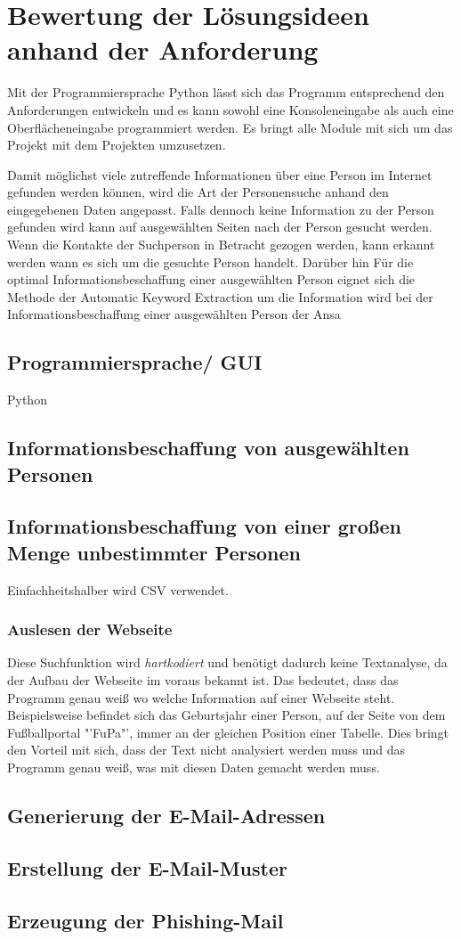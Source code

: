 

\chapter{Bewertung der Lösungsideen anhand der Anforderung}  %
\label{cha:Auswahl der Lösung anhand Anforderungen} %
Mit der Programmiersprache Python lässt sich das Programm entsprechend den Anforderungen entwickeln und es kann sowohl eine Konsoleneingabe als auch eine Oberflächeneingabe programmiert werden. Es bringt alle Module mit sich um das Projekt mit dem Projekten umzusetzen.

Damit möglichst viele zutreffende Informationen über eine Person im Internet gefunden werden können, wird die Art der Personensuche anhand den eingegebenen Daten angepasst. Falls dennoch keine Information zu der Person gefunden wird kann auf ausgewählten Seiten nach der Person gesucht werden.\\
Wenn die Kontakte der Suchperson in Betracht gezogen werden, kann erkannt werden wann es sich um die gesuchte Person handelt. Darüber hin
Für die optimal Informationsbeschaffung einer ausgewählten Person eignet sich die Methode der Automatic Keyword Extraction um die Information wird bei der Informationsbeschaffung einer ausgewählten Person der Ansa
\section{Programmiersprache/ GUI}
Python
\section{Informationsbeschaffung von ausgewählten Personen}
	
\section{Informationsbeschaffung von einer großen Menge unbestimmter Personen}
Einfachheitshalber wird CSV verwendet.
	\subsection{Auslesen der Webseite}
	Diese Suchfunktion wird \textit{hartkodiert} und benötigt dadurch keine Textanalyse, da der Aufbau der Webseite im voraus bekannt ist. Das bedeutet, dass das Programm genau weiß wo welche Information auf einer Webseite steht. Beispielsweise befindet sich das Geburtsjahr einer Person, auf der Seite von dem Fußballportal "'FuPa"', immer an der gleichen Position einer Tabelle. Dies bringt den Vorteil mit sich, dass der Text nicht analysiert werden muss und das Programm genau weiß, was mit diesen Daten gemacht werden muss.
\section{Generierung der E-Mail-Adressen}

\section{Erstellung der E-Mail-Muster}

\section{Erzeugung der Phishing-Mail}